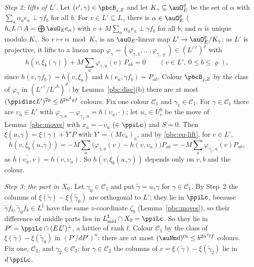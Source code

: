 \documentclass[10pt]{amsart}
\theoremstyle{definition}
\theoremstyle{remark}
\providecommand{\aubar}[1]{\overline{#1}}
\begin{document}
\emph{Step 2: lifts of $L'$.} Let $(c',\gamma)\in\pbcB_{j,Z}$ and let $K_\gamma\subseteq\auO_E^\varrho$ be the
set of $\alpha$ with $\sum_a\alpha_ae_a\perp\gamma f_b$ for all $b$. For $v\in L'\subseteq L_\gamma$ there is
$\alpha\in\auO_E^\varrho$ ($h_cL\cap A=\bigoplus\auO_Ee_a$) with $v+M\sum_a\alpha_ae_a\perp\gamma f_b$ for all
$b$, and $\alpha$ is unique modulo $K_\gamma$. So $v\mapsto\alpha\bmod K_\gamma$ is an $\auO_E$-linear map
$L'\to\auO_E^\varrho/K_\gamma$; as $L'$ is projective, it lifts to a linear map $\varphi_\gamma=(\varphi_{\gamma,
1},\dots,\varphi_{\gamma,\varrho})\in(L'^\vee)^\varrho$ with
\begin{equation}\label{pbc:eq-lift}
h(v,\xi_b(\gamma))+M\sum_a\aubar{\varphi_{\gamma,a}(v)}\,P_{ab}=0\qquad(v\in L',\ 0\le b\le\varrho),
\end{equation}
since $h(v,\gamma f_b)=h(v,\xi_b)$ and $h(e_a,\gamma f_b)=P_{ab}$. Colour $\pbcB_{j,Z}$ by the class of
$\varphi_\gamma$ in $(L'^\vee/L'^h)^\varrho$: by Lemma~\ref{pbc:disc}(b) there are at most $(\ppidisc
L')^{2\varrho}\le b^{2n^3\varrho f}$ colours. Fix one colour $\mathcal C_1$ and $\gamma_1\in\mathcal C_1$. For
$\gamma\in\mathcal C_1$ there are $\upsilon_a\in L'$ with $\varphi_{\gamma,a}-\varphi_{\gamma_1,a}=h(\upsilon_a,\cdot)$; let
$u_\gamma\in U_c^0$ be the move of Lemma~\ref{pbc:moves} with $x_a=-\upsilon_a$ ($\in\ppiLc$) and $S=0$. Then
$\xi(u_\gamma\gamma)=\xi(\gamma)+Y'P$ with $Y'=(M\upsilon_a)_a$, and by \eqref{pbc:eq-lift}, for $v\in L'$,
\[
h(v,\xi_b(u_\gamma\gamma))=-M\sum_a\bigl(\aubar{\varphi_{\gamma,a}(v)}-h(v,\upsilon_a)\bigr)P_{ab}=-M\sum_a
\aubar{\varphi_{\gamma_1,a}(v)}P_{ab},
\]
as $\aubar{h(\upsilon_a,v)}=h(v,\upsilon_a)$. So $h(v,\xi_b(u_\gamma\gamma))$ depends only on $v,b$ and the colour.

\emph{Step 3: the part in $X_0$.} Let $\gamma_0\in\mathcal C_1$ and put $\tilde\gamma=u_\gamma\gamma$ for
$\gamma\in\mathcal C_1$. By Step~2 the columns of $\xi(\tilde\gamma)-\xi(\tilde\gamma_0)$ are orthogonal to
$L'$; they lie in $\ppiLc$, because $\tilde\gamma f_b,\tilde\gamma_0f_b\in L^\sharp$ have the same
$z$-coordinate $\zeta_b$ (Lemma~\ref{pbc:moves}), so their difference of middle parts lies in
$L^\sharp_{\rm mid}\cap X_0=\ppiLc$. So they lie in $P'=\ppiLc\cap(EL')^\perp$, a lattice of rank $l$.
Colour $\mathcal C_1$ by the class of $\xi(\tilde\gamma)-\xi(\tilde\gamma_0)$ in $(P'/dP')^n$: there are at
most $(\auNm d)^{ln}\le b^{2n^4lf}$ colours. Fix one, $\mathcal C_2$, and $\gamma_2\in\mathcal C_2$; for
$\gamma\in\mathcal C_2$ the columns of $v=\xi(\tilde\gamma)-\xi(\tilde\gamma_2)$ lie in $d\,\ppiLc$.
\end{document}

